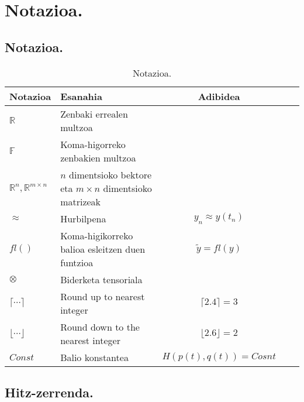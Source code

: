 \chapter{Notazioa.}

\section{Notazioa.}

\begin{table}
\caption{Notazioa.}
\label{tab:21}       %
\begin{tabular}{ l l c c c } 
 \hline
 Notazioa                                    &  Esanahia                                    & Adibidea \\
 \hline
 $\mathbb{R}$                                &  Zenbaki errealen multzoa                    &  \\
 $\mathbb{F}$                                &  Koma-higorreko zenbakien multzoa            &  \\
 $\mathbb{R}^{n},\mathbb{R}^{m \times n}$    &  $n$ dimentsioko bektore eta $m \times n$ dimentsioko matrizeak   & \\
 $\approx$                                   &  Hurbilpena                                  & $y_n \approx y(t_n)$ \\
 $fl()$                                      &  Koma-higikorreko balioa esleitzen duen funtzioa & $\tilde{y}=fl(y)$ \\
 $\otimes$                                   &  Biderketa tensoriala                        &                       \\
 $\lceil \cdots \rceil$                      &  Round up to nearest integer                 & $\lceil 2.4 \rceil=3$ \\
 $\lfloor \cdots \rfloor$                    &  Round down to the nearest integer          & $\lfloor 2.6 \rfloor=2$ \\
 $Const$                                     &  Balio konstantea                           & $H(p(t),q(t))=Cosnt$ \\
 \hline
 \end{tabular}
\end{table}

\section{Hitz-zerrenda.}

